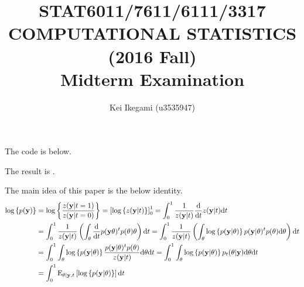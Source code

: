 \documentclass{article}
\begin{document}
\title{STAT6011/7611/6111/3317 \\ 
COMPUTATIONAL STATISTICS (2016 Fall)\\
Midterm Examination}
\author{Kei Ikegami (u3535947)}
\maketitle

\section{}
The code is below.

The result is .
\par
The main idea of this paper is the below identity.
\begin{align*}
	{\rm log} \left\{ p({\bf y}) \right\} &= {\rm log} \left\{ \frac{z({\bf y}| t=1)}{z({\bf y} | t=0)} \right\} = \left[ {\rm log}\left\{z({\bf y} | t)\right\} \right]_0^1 = \int_0^1 \frac{1}{z({\bf y} | t)} \frac{\mathrm{d}}{\mathrm{d} t} z({\bf y} | t) \mathrm{d}t\\
	&= \int_0^1 \frac{1}{z({\bf y} | t)} \left( \int_{\theta} \frac{\mathrm{d}}{\mathrm{d}t} p({\bf y}\theta)^t p(\theta) \mathrm{\theta} \right) \mathrm{d}t = \int_0^1 \frac{1}{z({\bf y} | t)} \left( \int_{\theta} {\rm log} \left\{ p({\bf y} | \theta) \right\} p({\bf y} | \theta)^t p(\theta) \mathrm{d}\theta \right) \mathrm{d} t\\
	&= \int_0^1 \int_{\theta} {\rm log} \left\{ p({\bf y} | \theta) \right\} \frac{p({\bf y} | \theta)^t p(\theta)}{z({\bf y} | t)} \mathrm{d} \theta \mathrm{d} t = \int_0^1 \int_{\theta} {\rm log} \left\{ p({\bf y} | \theta) \right\} p_t(\theta | {\bf y}) \mathrm{d} \theta \mathrm{d} t\\
	&= \int_0^1 {\rm E}_{\theta | {\bf y}, t} \left[ {\rm log}\left\{ p({\bf y} | \theta) \right\} \right] \mathrm{d}t
\end{align*}
\end{document}

